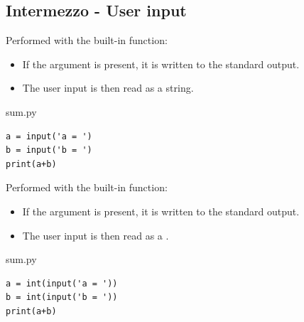 \documentclass[aspectratio=1610,t]{beamer}
\begin{document}
\subsection{Intermezzo - User input}
\begin{pframe}
Performed with the  built-in function:
 \begin{itemize}
  \item If the  argument is present, it is written to the standard
        output.
  \item The user input is then read as a string.
 \end{itemize}
 \pause
 \begin{pythonfile}{sum.py}
  \begin{verbatim}
a = input('a = ')
b = input('b = ')
print(a+b)
  \end{verbatim}
 \end{pythonfile}
 \pause
 \begin{terminal}
 \end{terminal}
 \pause
\end{pframe}

\begin{pframe}
Performed with the  built-in function:
 \begin{itemize}
  \item If the  argument is present, it is written to the standard
        output.
  \item The user input is then read as a .
 \end{itemize}
 \begin{pythonfile}{sum.py}
  \begin{verbatim}
a = int(input('a = '))
b = int(input('b = '))
print(a+b)
  \end{verbatim}
 \end{pythonfile}
 \begin{terminal}
 \end{terminal}
\end{pframe}
\end{document}
